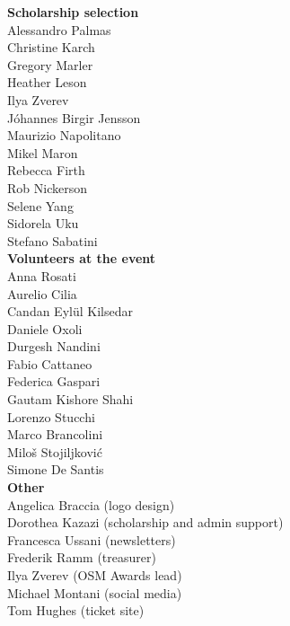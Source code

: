 \begin{multicols}{2}
\begin{small}
    \vspace{\volunteerSpace}
    \textbf{Scholarship selection}\\
    Alessandro Palmas\\
    Christine Karch\\
    Gregory Marler\\
    Heather Leson\\
    Ilya Zverev\\
    Jóhannes Birgir Jensson\\
    Maurizio Napolitano\\
    Mikel Maron\\
    Rebecca Firth\\
    Rob Nickerson\\
    Selene Yang\\
    Sidorela Uku\\
    Stefano Sabatini\\

    \vspace{\volunteerSpace}
    \textbf{Volunteers at the event}\\
    Anna Rosati\\
    Aurelio Cilia\\
    Candan Eylül Kilsedar\\
    Daniele Oxoli\\
    Durgesh Nandini\\
    Fabio Cattaneo\\
    Federica Gaspari\\
    Gautam Kishore Shahi\\
    Lorenzo Stucchi\\
    Marco Brancolini\\
    Miloš Stojiljković\\
    Simone De Santis\\

    \vspace{\volunteerSpace}
    \textbf{Other}\\
    Angelica Braccia (logo design)\\
    Dorothea Kazazi (scholarship and admin support)\\
    Francesca Ussani (newsletters)\\
    Frederik Ramm (treasurer)\\
    Ilya Zverev (OSM Awards lead)\\
    Michael Montani (social media)\\
    Tom Hughes (ticket site)\\
  \end{small}
\end{multicols}
\justifying

\newpage
\pagestyle{sponsor-microsoft}
\null
\newpage
\pagestyle{sponsor-facebook}
\null
\newpage
\pagestyle{sponsor-mapbox}
\null
\newpage
